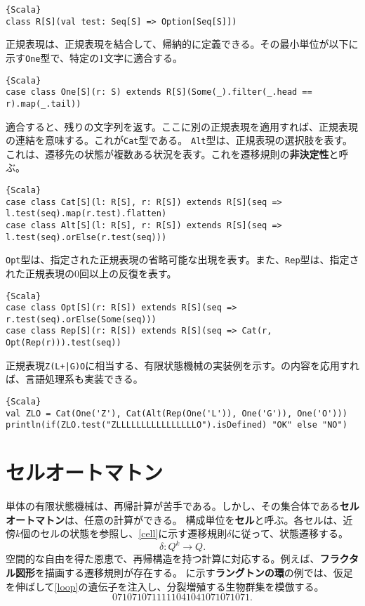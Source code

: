 \documentclass[10pt,a4paper]{book}
\begin{document}
\begin{Verbatim}{Scala}
class R[S](val test: Seq[S] => Option[Seq[S]])
\end{Verbatim}

正規表現は、正規表現を結合して、帰納的に定義できる。その最小単位が以下に示す\texttt{One}型で、特定の1文字に適合する。

\begin{Verbatim}{Scala}
case class One[S](r: S) extends R[S](Some(_).filter(_.head == r).map(_.tail))
\end{Verbatim}

適合すると、残りの文字列を返す。ここに別の正規表現を適用すれば、正規表現の連結を意味する。これが\texttt{Cat}型である。
\texttt{Alt}型は、正規表現の選択肢を表す。これは、遷移先の状態が複数ある状況を表す。これを遷移規則の\textbf{非決定性}と呼ぶ。

\begin{Verbatim}{Scala}
case class Cat[S](l: R[S], r: R[S]) extends R[S](seq => l.test(seq).map(r.test).flatten)
case class Alt[S](l: R[S], r: R[S]) extends R[S](seq => l.test(seq).orElse(r.test(seq)))
\end{Verbatim}

\texttt{Opt}型は、指定された正規表現の省略可能な出現を表す。また、\texttt{Rep}型は、指定された正規表現の0回以上の反復を表す。

\begin{Verbatim}{Scala}
case class Opt[S](r: R[S]) extends R[S](seq => r.test(seq).orElse(Some(seq)))
case class Rep[S](r: R[S]) extends R[S](seq => Cat(r, Opt(Rep(r))).test(seq))
\end{Verbatim}

正規表現\texttt{Z(L+|G)O}に相当する、有限状態機械の実装例を示す。の内容を応用すれば、言語処理系も実装できる。

\begin{Verbatim}{Scala}
val ZLO = Cat(One('Z'), Cat(Alt(Rep(One('L')), One('G')), One('O')))
println(if(ZLO.test("ZLLLLLLLLLLLLLLLLO").isDefined) "OK" else "NO")
\end{Verbatim}

\section{セルオートマトン\label{sect:cell}}

単体の有限状態機械は、再帰計算が苦手である。しかし、その集合体である\textbf{セルオートマトン}は、任意の計算ができる。
構成単位を\textbf{セル}と呼ぶ。各セルは、近傍$k$個のセルの状態を参照し、\eqref{cell}に示す遷移規則$\delta$に従って、状態遷移する。
%
\begin{equation}
\label{eq:cell}
\delta: Q^k \to Q.
\end{equation}
%
空間的な自由を得た恩恵で、再帰構造を持つ計算に対応する。例えば、\textbf{フラクタル図形}を描画する遷移規則が存在する。
に示す\textbf{ラングトンの環}の例では、仮足を伸ばして\eqref{loop}の遺伝子を注入し、分裂増殖する生物群集を模倣する。
%
\begin{equation}
\label{eq:loop}
0710710711111041041071071071.
\end{equation}
\end{document}
